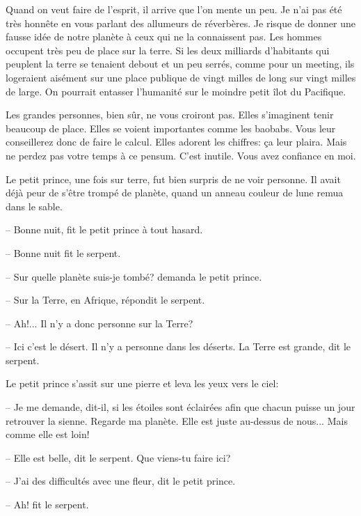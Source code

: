 \documentclass[a4paper]{report}
\begin{document}

\parachapter{} %
Quand on veut faire de l'esprit, il arrive que l'on mente un peu. Je n'ai pas été très honnête en vous parlant des allumeurs de réverbères. Je risque de donner une fausse idée de notre planète à ceux qui ne la connaissent pas. Les hommes occupent très peu de place sur la terre. Si les deux milliards d'habitants qui peuplent la terre se tenaient debout et un peu serrés, comme pour un meeting,  ils logeraient aisément sur une place publique de vingt milles de long sur vingt milles de large. On pourrait entasser l'humanité sur le moindre petit îlot du Pacifique.

Les grandes personnes, bien sûr, ne vous croiront pas. Elles s'imaginent tenir beaucoup de place. Elles se voient importantes comme les baobabs. Vous leur conseillerez donc de faire le calcul. Elles adorent les chiffres: ça leur plaira. Mais ne perdez pas votre temps à ce pensum. C'est inutile. Vous avez confiance en moi.

Le petit prince, une fois sur terre, fut bien surpris de ne voir personne. Il avait déjà peur de s'être trompé de planète, quand un anneau couleur de lune remua dans le sable.

-- Bonne nuit, fit le petit prince à tout hasard.

-- Bonne nuit fit le serpent.

-- Sur quelle planète suis-je tombé? demanda le petit prince.

-- Sur la Terre, en Afrique, répondit le serpent.

-- Ah!... Il n'y a donc personne sur la Terre?

-- Ici c'est le désert. Il n'y a personne dans les déserts. La Terre est grande, dit le serpent.

Le petit prince s'assit sur une pierre et leva les yeux vers le ciel:

-- Je me demande, dit-il, si les étoiles sont éclairées afin que chacun puisse un jour retrouver la sienne. Regarde ma planète. Elle est juste au-dessus de nous... Mais comme elle est loin!

-- Elle est belle, dit le serpent. Que viens-tu faire ici?

-- J'ai des difficultés avec une fleur, dit le petit prince.

-- Ah! fit le serpent.
\end{document}
